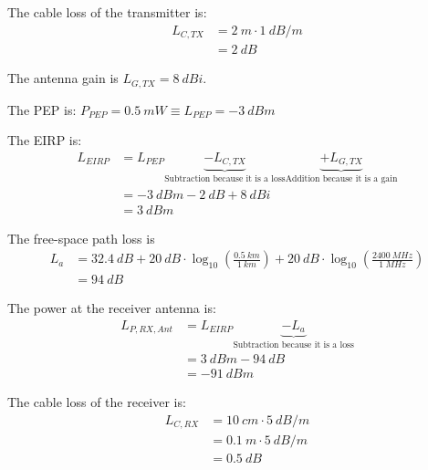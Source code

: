 \begin{solution}
\begin{tasks}
		\task
		The cable loss of the transmitter is:
		\begin{equation*}
			\begin{split}
				L_{C,TX} &= \SI{2}{m} \cdot \SI{1}{dB/m} \\
				 &= \SI{2}{dB}
			\end{split}
		\end{equation*}
	
		The antenna gain is $L_{G,TX} = \SI{8}{dBi}$.
	
		The PEP is: $P_{PEP} = \SI{0.5}{mW} \equiv L_{PEP} = \SI{-3}{dBm}$
		
		The EIRP is:
		\begin{equation*}
			\begin{split}
				L_{EIRP} &= L_{PEP} \underbrace{- L_{C,TX}}_{\text{Subtraction because it is a loss}} \underbrace{+ L_{G,TX}}_{\text{Addition because it is a gain}} \\
				 &= \SI{-3}{dBm} - \SI{2}{dB} + \SI{8}{dBi} \\
				 &= \SI{3}{dBm}
			\end{split}
		\end{equation*}
		
		\task
		The free-space path loss is
		\begin{equation*}
			\begin{split}
				L_a &= \SI{32.4}{dB} + \SI{20}{dB} \cdot \log_{10}\left(\frac{\SI{0.5}{km}}{\SI{1}{km}}\right) + \SI{20}{dB} \cdot \log_{10}\left(\frac{\SI{2400}{MHz}}{\SI{1}{MHz}}\right) \\
				&= \SI{94}{dB}
			\end{split}
		\end{equation*}
	
	
		The power at the receiver antenna is:
		\begin{equation*}
			\begin{split}
				L_{P,RX,Ant} &= L_{EIRP} \underbrace{- L_{a}}_{\text{Subtraction because it is a loss}} \\
				 &= \SI{3}{dBm} - \SI{94}{dB}\\
				 &= \SI{-91}{dBm}
			\end{split}
		\end{equation*}
	
		\task
		The cable loss of the receiver is:
		\begin{equation*}
			\begin{split}
				L_{C,RX} &= \SI{10}{cm} \cdot \SI{5}{dB/m} \\
				 &= \SI{0.1}{m} \cdot \SI{5}{dB/m} \\
				 &= \SI{0.5}{dB}
			\end{split}
		\end{equation*}
	

\end{tasks}
\end{solution}
